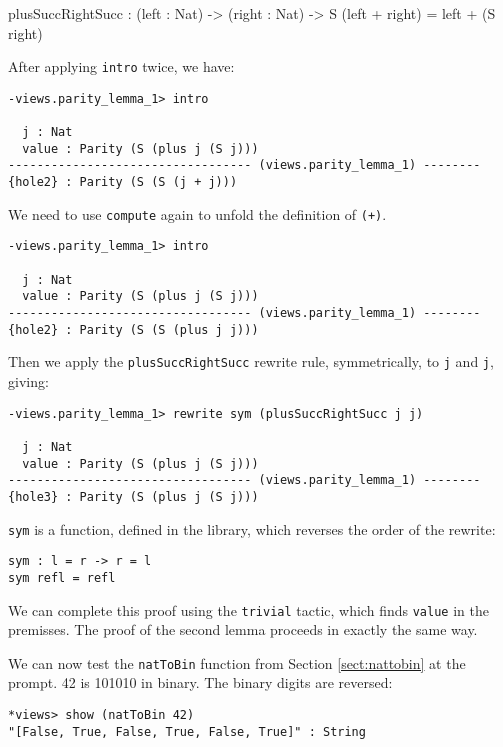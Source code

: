 \begin{code}
plusSuccRightSucc : (left : Nat) -> (right : Nat) ->
  S (left + right) = left + (S right)
\end{code}

\noindent
After applying \texttt{intro} twice, we have:

\begin{lstlisting}
-views.parity_lemma_1> intro 

  j : Nat
  value : Parity (S (plus j (S j)))
---------------------------------- (views.parity_lemma_1) --------
{hole2} : Parity (S (S (j + j)))
\end{lstlisting}

\noindent
We need to use \texttt{compute} again to unfold the definition of \texttt{(+)}.

\begin{lstlisting}
-views.parity_lemma_1> intro 

  j : Nat
  value : Parity (S (plus j (S j)))
---------------------------------- (views.parity_lemma_1) --------
{hole2} : Parity (S (S (plus j j)))
\end{lstlisting}

\noindent
Then we apply the \texttt{plusSuccRightSucc} rewrite rule, symmetrically,
to \texttt{j} and \texttt{j}, giving:

\begin{lstlisting}
-views.parity_lemma_1> rewrite sym (plusSuccRightSucc j j) 
 
  j : Nat
  value : Parity (S (plus j (S j)))
---------------------------------- (views.parity_lemma_1) --------
{hole3} : Parity (S (plus j (S j)))
\end{lstlisting}

\noindent
\texttt{sym} is a function, defined in the library, which reverses the order of the rewrite:

\begin{lstlisting}
sym : l = r -> r = l
sym refl = refl
\end{lstlisting} 

\noindent
We can complete this proof using the \texttt{trivial} tactic, which finds 
\texttt{value} in the premisses. The proof of the second lemma proceeds in
exactly the same way.

We can now test the \texttt{natToBin} function from Section 
\ref{sect:nattobin} at the prompt. 42 is 101010 in
binary. The binary digits are reversed:

\begin{lstlisting}
*views> show (natToBin 42)
"[False, True, False, True, False, True]" : String
\end{lstlisting}


